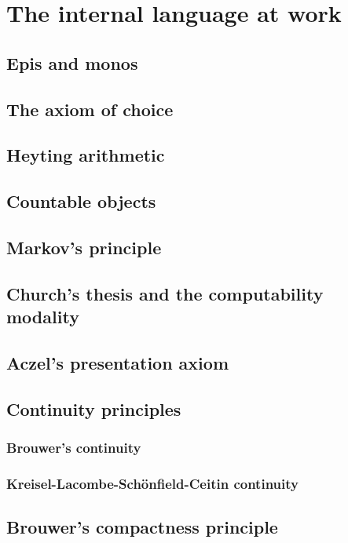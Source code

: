 \chapter{The internal language at work}
\label{cha:internal-language-at}

\section{Epis and monos}
\label{sec:epis-monos}

\section{The axiom of choice}
\label{sec:axiom-choice}

\section{Heyting arithmetic}
\label{sec:heyting-arithmetic}

\section{Countable objects}
\label{sec:countable-objects}

\section{Markov's principle}
\label{sec:markovs-principle}

\section{Church's thesis and the computability modality}
\label{sec:church-thesis}

\section{Aczel's presentation axiom}
\label{sec:aczels-pres-axiom}

\section{Continuity principles}
\label{sec:cont-princ}

\subsection{Brouwer's continuity}
\label{sec:brouw-cont-princ}

\subsection{Kreisel-Lacombe-Schönfield-Ceitin continuity}
\label{sec:kreis-lacombe-schonf}

\section{Brouwer's compactness principle}
\label{sec:cont-princ}




